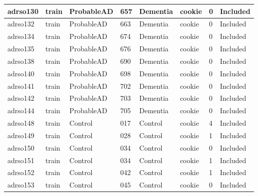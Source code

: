 \begin{center}
\begin{longtable}{|l|l|l|l|l|l|l|l|}
adrso130  & train            & ProbableAD   & 657         & Dementia             & cookie          & 0                & Included      \\ \hline
adrso132  & train            & ProbableAD   & 663         & Dementia             & cookie          & 0                & Included      \\ \hline
adrso134  & train            & ProbableAD   & 674         & Dementia             & cookie          & 0                & Included      \\ \hline
adrso135  & train            & ProbableAD   & 676         & Dementia             & cookie          & 0                & Included      \\ \hline
adrso138  & train            & ProbableAD   & 690         & Dementia             & cookie          & 0                & Included      \\ \hline
adrso140  & train            & ProbableAD   & 698         & Dementia             & cookie          & 0                & Included      \\ \hline
adrso141  & train            & ProbableAD   & 702         & Dementia             & cookie          & 0                & Included      \\ \hline
adrso142  & train            & ProbableAD   & 703         & Dementia             & cookie          & 0                & Included      \\ \hline
adrso144  & train            & ProbableAD   & 705         & Dementia             & cookie          & 0                & Included      \\ \hline
adrso148  & train            & Control      & 017         & Control              & cookie          & 4                & Included      \\ \hline
adrso149  & train            & Control      & 028         & Control              & cookie          & 1                & Included      \\ \hline
adrso150  & train            & Control      & 034         & Control              & cookie          & 0                & Included      \\ \hline
adrso151  & train            & Control      & 034         & Control              & cookie          & 1                & Included      \\ \hline
adrso152  & train            & Control      & 042         & Control              & cookie          & 1                & Included      \\ \hline
adrso153  & train            & Control      & 045         & Control              & cookie          & 0                & Included      \\ \hline

\end{longtable}
\end{center}
